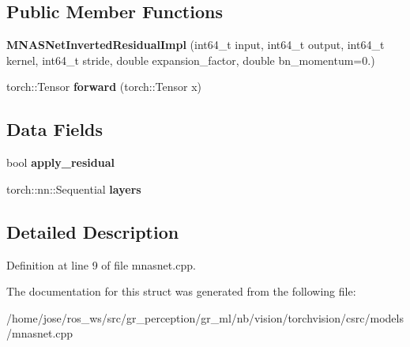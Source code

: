 \subsection*{Public Member Functions}
\begin{DoxyCompactItemize}
\item 
\mbox{\label{structvision_1_1models_1_1MNASNetInvertedResidualImpl_a6538421b23a54c52487888815ff56ffe}} 
{\bfseries M\+N\+A\+S\+Net\+Inverted\+Residual\+Impl} (int64\+\_\+t input, int64\+\_\+t output, int64\+\_\+t kernel, int64\+\_\+t stride, double expansion\+\_\+factor, double bn\+\_\+momentum=0.)
\item 
\mbox{\label{structvision_1_1models_1_1MNASNetInvertedResidualImpl_ae30bc59ec30455b2c7f405fa4f002255}} 
torch\+::\+Tensor {\bfseries forward} (torch\+::\+Tensor x)
\end{DoxyCompactItemize}
\subsection*{Data Fields}
\begin{DoxyCompactItemize}
\item 
\mbox{\label{structvision_1_1models_1_1MNASNetInvertedResidualImpl_a0e24cd4876ca8b898f770a3ddfd594b0}} 
bool {\bfseries apply\+\_\+residual}
\item 
\mbox{\label{structvision_1_1models_1_1MNASNetInvertedResidualImpl_a8a4e6a2fc68b5a3bbac9ecfe621794a6}} 
torch\+::nn\+::\+Sequential {\bfseries layers}
\end{DoxyCompactItemize}


\subsection{Detailed Description}


Definition at line 9 of file mnasnet.\+cpp.



The documentation for this struct was generated from the following file\+:\begin{DoxyCompactItemize}
\item 
/home/jose/ros\+\_\+ws/src/gr\+\_\+perception/gr\+\_\+ml/nb/vision/torchvision/csrc/models/mnasnet.\+cpp\end{DoxyCompactItemize}
